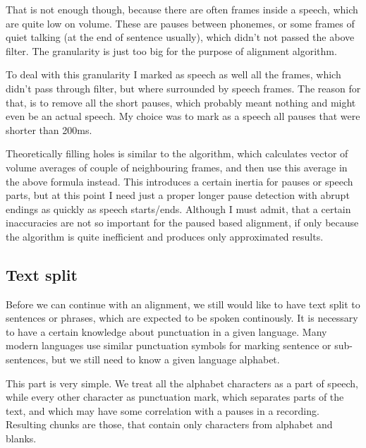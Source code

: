 \documentclass[12pt,a4paper,english]{article}
\begin{document}
That is not enough though, because there are often frames inside a speech, which are quite low on volume. These are pauses between phonemes, or some frames of quiet talking (at the end of sentence usually), which didn't not passed the above filter. The granularity is just too big for the purpose of alignment algorithm. \newline

To deal with this granularity I marked as speech as well all the frames, which didn't pass through filter, but where surrounded by speech frames.
The reason for that, is to remove all the short pauses, which probably meant nothing and might even be an actual speech. My choice was to mark as a speech all pauses that were shorter than 200ms. \newline

Theoretically filling holes is similar to the algorithm, which calculates vector of volume averages of couple of neighbouring frames, and then use this average in the above formula instead. This introduces a certain inertia for pauses or speech parts, but at this point I need just a proper longer pause detection with abrupt endings as quickly as speech starts/ends. Although I must admit, that a certain inaccuracies are not so important for the paused based alignment, if only because the algorithm is quite inefficient and produces only approximated results.

\newpage

\subsection{Text split}

Before we can continue with an alignment, we still would like to have text split to sentences or phrases, which are expected to be spoken continously. It is necessary to have a certain knowledge about punctuation in a given language.  Many modern languages use similar punctuation symbols for marking sentence or sub-sentences,
but we still need to know a given language alphabet. \newline

This part is very simple. We treat all the alphabet characters as a part of speech, while every other character as punctuation mark, which separates parts of the text, and which may have some correlation with a pauses in a recording. Resulting chunks are those, that contain only characters from alphabet and blanks. \newline
\end{document}
